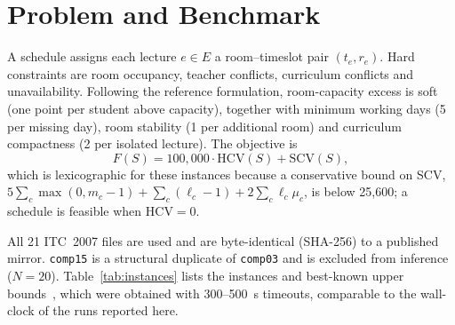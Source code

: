 \documentclass[journal]{IEEEtran}
\newcommand{\code}[1]{\texttt{#1}}
\begin{document}
\section{Problem and Benchmark}
\label{sec:problem}
A schedule assigns each lecture $e\in E$ a room--timeslot pair $(t_e,r_e)$. Hard constraints are room occupancy, teacher conflicts, curriculum conflicts and unavailability. Following the reference formulation, room-capacity excess is soft (one point per student above capacity), together with minimum working days (5 per missing day), room stability (1 per additional room) and curriculum compactness (2 per isolated lecture). The objective is
\begin{equation}
F(S)=100{,}000\cdot \mathrm{HCV}(S)+\mathrm{SCV}(S),
\end{equation}
which is lexicographic for these instances because a conservative bound on SCV, $5\sum_c\max(0,m_c-1)+\sum_c(\ell_c-1)+2\sum_c\ell_c\mu_c$, is below 25{,}600; a schedule is feasible when $\mathrm{HCV}=0$.

All 21 ITC~2007 files are used and are byte-identical (SHA-256) to a published mirror. \code{comp15} is a structural duplicate of \code{comp03} and is excluded from inference ($N=20$). Table~\ref{tab:instances} lists the instances and best-known upper bounds~\cite{ceschia2022educational}, which were obtained with 300--500~s timeouts, comparable to the wall-clock of the runs reported here.
\end{document}
